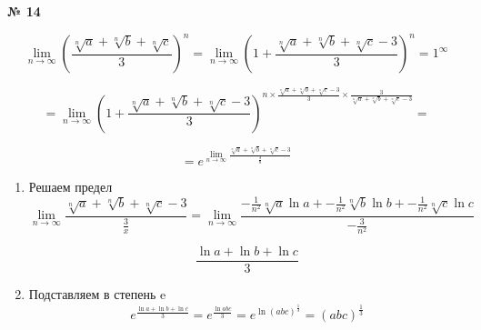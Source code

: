 \documentclass{article}
\begin{document}
\textbf{№ 14} 

\begingroup
\Large

$$ \lim\limits_{n\to \infty} \left( \frac{\sqrt[n]{a} + \sqrt[n]{b} + \sqrt[n]{c}}{3} \right)^{n}
= \lim\limits_{n\to \infty} \left( 1 + \frac{\sqrt[n]{a} + \sqrt[n]{b} + \sqrt[n]{c} - 3}{3} \right)^{n}
= 1^{\infty} $$

$$ = \lim\limits_{n\to \infty} \left( 1 + \frac{\sqrt[n]{a} + \sqrt[n]{b} + \sqrt[n]{c} - 3}{3} \right)^{n \times \frac{\sqrt[n]{a} + \sqrt[n]{b} + \sqrt[n]{c} - 3}{3} \times \frac{3}{\sqrt[n]{a} + \sqrt[n]{b} + \sqrt[n]{c} - 3}} 
= $$

$$ = e^{\lim\limits_{n\to \infty} \frac{\sqrt[n]{a} + \sqrt[n]{b} + \sqrt[n]{c} - 3}{\frac{3}{n}}}
$$

\begin{enumerate}
\item Решаем предел
$$ \lim\limits_{n\to \infty} \frac{\sqrt[n]{a} + \sqrt[n]{b} + \sqrt[n]{c} - 3}{\frac{3}{x}}
= \lim\limits_{n\to \infty} \frac{ -\frac{1}{n^2}\sqrt[n]{a}\ln{a} + -\frac{1}{n^2}\sqrt[n]{b}\ln{b} + -\frac{1}{n^2}\sqrt[n]{c}\ln{c} }{-\frac{3}{n^2}}$$

$$ \frac{\ln{a} + \ln{b} + \ln{c}}{3}
$$

\item Подставляем в степень e
$$ e^{\frac{\ln{a} + \ln{b} + \ln{c}}{3}}
= e^{\frac{\ln{abc}}{3}}
= e^{\ln{(abc)}^{\frac{1}{3}}}
= (abc)^{\frac{1}{3}}$$

\end{enumerate}
\endgroup
\end{document}
